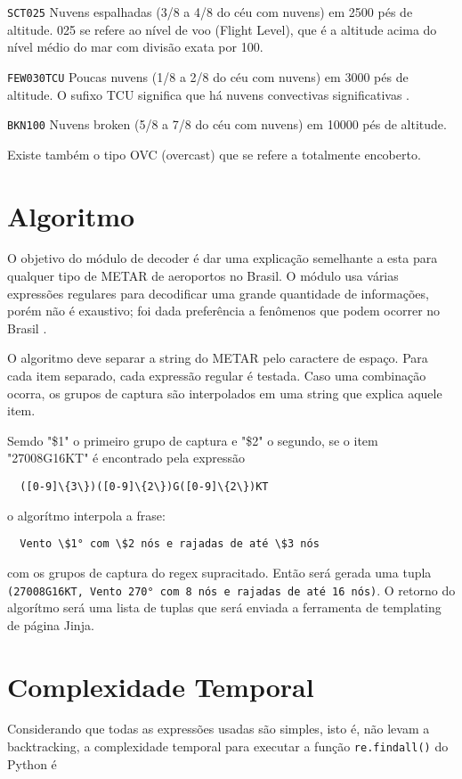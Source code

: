 \texttt{SCT025} Nuvens espalhadas (3/8 a 4/8 do céu com nuvens) em 2500 pés de altitude. 025 se refere ao nível 
de voo (Flight Level), que é a altitude acima do nível médio do mar com divisão exata por 100.

\texttt{FEW030TCU} Poucas nuvens (1/8 a 2/8 do céu com nuvens) em 3000 pés de altitude. O sufixo TCU significa 
que há nuvens convectivas significativas \cite{decea-mil}.

\texttt{BKN100} Nuvens broken (5/8 a 7/8 do céu com nuvens) em 10000 pés de altitude.

Existe também o tipo OVC (overcast) que se refere a totalmente encoberto.

\section{Algoritmo}

O objetivo do módulo de decoder é dar uma explicação semelhante a esta para qualquer tipo de METAR de aeroportos 
no Brasil. O módulo usa várias expressões regulares para decodificar uma grande quantidade de informações, porém 
não é exaustivo; foi dada preferência a fenômenos que podem ocorrer no Brasil \cite{decea-mil}.

O algoritmo deve separar a string do METAR pelo caractere de espaço. Para cada item separado, cada expressão regular 
é testada. Caso uma combinação ocorra, os grupos de captura são interpolados em uma string que explica aquele item. 

Semdo "\$1" o primeiro grupo de captura e "\$2" o segundo, se o item "27008G16KT" é encontrado pela expressão 
\begin{verbatim}
  ([0-9]\{3\})([0-9]\{2\})G([0-9]\{2\})KT
\end{verbatim}

o algorítmo interpola a frase:

\begin{verbatim}
  Vento \$1° com \$2 nós e rajadas de até \$3 nós
\end{verbatim}

com os grupos de captura do regex supracitado. Então será gerada uma tupla
\texttt{(27008G16KT, Vento 270° com 8 nós e rajadas de até 16 nós)}. O retorno do 
algorítmo será uma lista de tuplas que será enviada a ferramenta de templating
de página Jinja.

\section{Complexidade Temporal}
Considerando que todas as expressões usadas são simples, isto é, não levam a backtracking, 
a complexidade temporal para executar a função \texttt{re.findall()} do Python é

